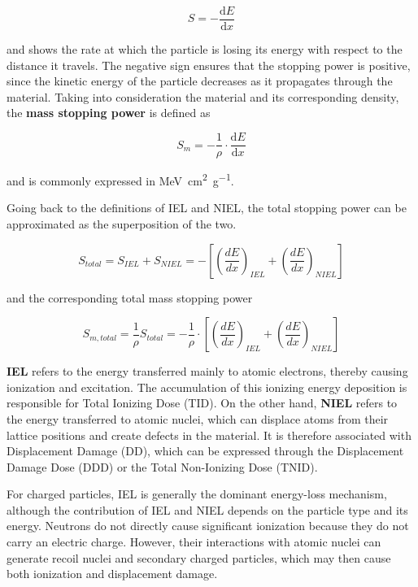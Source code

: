 \begin{equation}
    S = - \frac{\mathrm{d}E}{\mathrm{d}x}
    \label{eq:stopping-power}
\end{equation}

and shows the rate at which the particle is losing its energy with respect to the distance it travels. The negative sign ensures that the stopping power is positive, since the kinetic energy of the particle decreases as it propagates through the material. Taking into consideration the material and its corresponding density, the \textbf{mass stopping power} is defined as

\begin{equation}
    S_m = - \frac{1}{\rho} \cdot \frac{\mathrm{d}E}{\mathrm{d}x}
    \label{eq:mass-stopping-power}
\end{equation}

and is commonly expressed in \si{\mega\electronvolt\centi\metre\squared\per\gram}.

Going back to the definitions of IEL and NIEL, the total stopping power can be approximated as the superposition of the two.

\begin{equation}
    S_{total} = S_{IEL} + S_{NIEL} = - \left[ \left( \frac{dE}{dx} \right)_{IEL} + \left( \frac{dE}{dx} \right)_{NIEL} \right]
    \label{eq:stopping-power-total}
\end{equation}

and the corresponding total mass stopping power

\begin{equation}
    S_{m,total} = \frac{1}{\rho} S_{total} =  - \frac{1}{\rho} \cdot \left[ \left( \frac{dE}{dx} \right)_{IEL} + \left( \frac{dE}{dx} \right)_{NIEL} \right]
    \label{eq:mass-stopping-power-total}
\end{equation}

\textbf{IEL} refers to the energy transferred mainly to atomic electrons, thereby causing ionization and excitation. The accumulation of this ionizing energy deposition is responsible for Total Ionizing Dose (TID). On the other hand, \textbf{NIEL} refers to the energy transferred to atomic nuclei, which can displace atoms from their lattice positions and create defects in the material. It is therefore associated with Displacement Damage (DD), which can be expressed through the Displacement Damage Dose (DDD) or the Total Non-Ionizing Dose (TNID).

For charged particles, IEL is generally the dominant energy-loss mechanism, although the contribution of IEL and NIEL depends on the particle type and its energy. Neutrons do not directly cause significant ionization because they do not carry an electric charge. However, their interactions with atomic nuclei can generate recoil nuclei and secondary charged particles, which may then cause both ionization and displacement damage.

